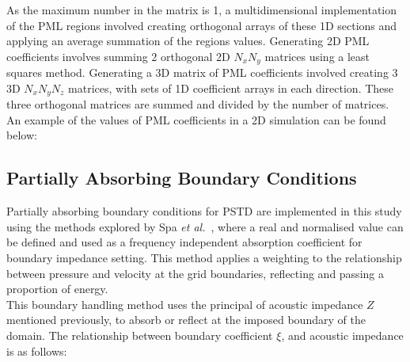 As the maximum number in the matrix is 1, a multidimensional implementation of the PML regions involved creating orthogonal arrays of these 1D sections and applying an average summation of the regions values. Generating 2D PML coefficients involves summing 2 orthogonal 2D $N_x N_y $ matrices using a least squares method. Generating a 3D matrix of PML coefficients involved creating 3 3D $N_x N_y N_z $ matrices, with sets of 1D coefficient arrays in each direction. These three orthogonal matrices are summed and divided by the number of matrices. An example of the values of PML coefficients in a 2D simulation can be found below:\\


\subsection{Partially Absorbing Boundary Conditions}
Partially absorbing boundary conditions for PSTD are implemented in this study using the methods explored by Spa \textit{et al.}~\cite{Spa2011}, where a real and normalised value can be defined and used as a frequency independent absorption coefficient for boundary impedance setting. This method applies a weighting to the relationship between pressure and velocity at the grid boundaries, reflecting and passing a proportion of energy.\\

This boundary handling method uses the principal of acoustic impedance $Z$ mentioned previously, to absorb or reflect at the imposed boundary of the domain. The relationship between boundary coefficient $\xi$, and acoustic impedance is as follows:

